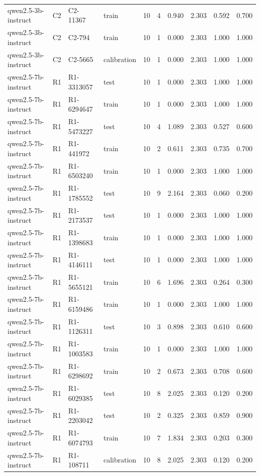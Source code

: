 \begin{table}
\begin{tabular}{llllrrrrrr}
qwen2.5-3b-instruct & C2 & C2-11367 & train & 10 & 4 & 0.940 & 2.303 & 0.592 & 0.700 \\
qwen2.5-3b-instruct & C2 & C2-794 & train & 10 & 1 & 0.000 & 2.303 & 1.000 & 1.000 \\
qwen2.5-3b-instruct & C2 & C2-5665 & calibration & 10 & 1 & 0.000 & 2.303 & 1.000 & 1.000 \\
qwen2.5-7b-instruct & R1 & R1-3313057 & test & 10 & 1 & 0.000 & 2.303 & 1.000 & 1.000 \\
qwen2.5-7b-instruct & R1 & R1-6294647 & train & 10 & 1 & 0.000 & 2.303 & 1.000 & 1.000 \\
qwen2.5-7b-instruct & R1 & R1-5473227 & test & 10 & 4 & 1.089 & 2.303 & 0.527 & 0.600 \\
qwen2.5-7b-instruct & R1 & R1-441972 & train & 10 & 2 & 0.611 & 2.303 & 0.735 & 0.700 \\
qwen2.5-7b-instruct & R1 & R1-6503240 & train & 10 & 1 & 0.000 & 2.303 & 1.000 & 1.000 \\
qwen2.5-7b-instruct & R1 & R1-1785552 & test & 10 & 9 & 2.164 & 2.303 & 0.060 & 0.200 \\
qwen2.5-7b-instruct & R1 & R1-2173537 & test & 10 & 1 & 0.000 & 2.303 & 1.000 & 1.000 \\
qwen2.5-7b-instruct & R1 & R1-1398683 & train & 10 & 1 & 0.000 & 2.303 & 1.000 & 1.000 \\
qwen2.5-7b-instruct & R1 & R1-4146111 & test & 10 & 1 & 0.000 & 2.303 & 1.000 & 1.000 \\
qwen2.5-7b-instruct & R1 & R1-5655121 & train & 10 & 6 & 1.696 & 2.303 & 0.264 & 0.300 \\
qwen2.5-7b-instruct & R1 & R1-6159486 & train & 10 & 1 & 0.000 & 2.303 & 1.000 & 1.000 \\
qwen2.5-7b-instruct & R1 & R1-1126311 & test & 10 & 3 & 0.898 & 2.303 & 0.610 & 0.600 \\
qwen2.5-7b-instruct & R1 & R1-1003583 & train & 10 & 1 & 0.000 & 2.303 & 1.000 & 1.000 \\
qwen2.5-7b-instruct & R1 & R1-6298692 & train & 10 & 2 & 0.673 & 2.303 & 0.708 & 0.600 \\
qwen2.5-7b-instruct & R1 & R1-6029385 & test & 10 & 8 & 2.025 & 2.303 & 0.120 & 0.200 \\
qwen2.5-7b-instruct & R1 & R1-2203042 & test & 10 & 2 & 0.325 & 2.303 & 0.859 & 0.900 \\
qwen2.5-7b-instruct & R1 & R1-6074793 & train & 10 & 7 & 1.834 & 2.303 & 0.203 & 0.300 \\
qwen2.5-7b-instruct & R1 & R1-108711 & calibration & 10 & 8 & 2.025 & 2.303 & 0.120 & 0.200 \\

\end{tabular}
\end{table}

